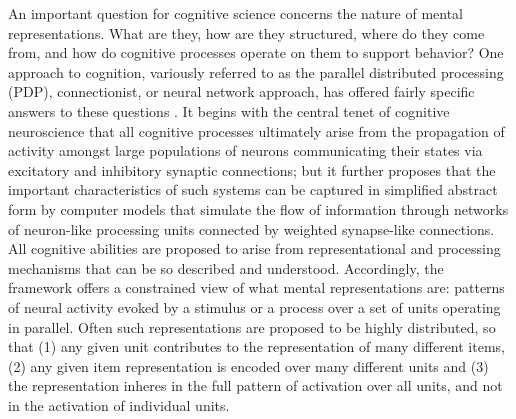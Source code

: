 An important question for cognitive science concerns the nature of mental representations. What are they, how are they structured, where do they come from, and how do cognitive processes operate on them to support behavior? One approach to cognition, variously referred to as the parallel distributed processing (PDP), connectionist, or neural network approach, has offered fairly specific answers to these questions \cite{McClellandRumelhart86}. It begins with the central tenet of cognitive neuroscience that all cognitive processes ultimately arise from the propagation of activity amongst large populations of neurons communicating their states via excitatory and inhibitory synaptic connections; but it further proposes that the important characteristics of such systems can be captured in simplified abstract form by computer models that simulate the flow of information through networks of neuron-like processing units connected by weighted synapse-like connections. All cognitive abilities are proposed to arise from representational and processing mechanisms that can be so described and understood. Accordingly, the framework offers a constrained view of what mental representations are: patterns of neural activity evoked by a stimulus or a process over a set of units operating in parallel. Often such representations are proposed to be highly distributed, so that (1) any given unit contributes to the representation of many different items, (2) any given item representation is encoded over many different units and (3) the representation inheres in the full pattern of activation over all units, and not in the activation of individual units.

